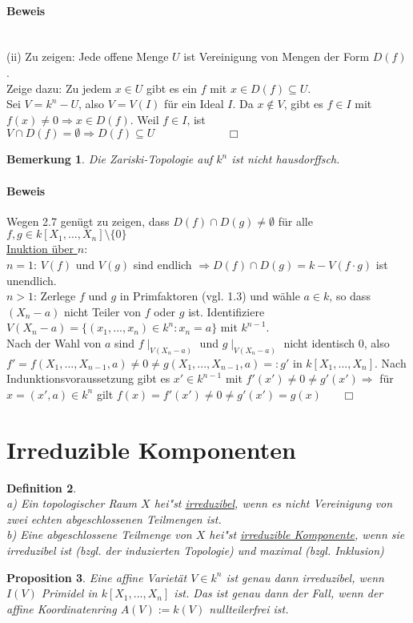 \documentclass[a4paper,12pt]{report}
\theoremstyle{break}
\newtheorem{Def}{Definition}[chapter]
\newtheorem{Bem}[Def]{Bemerkung}
\newtheorem{Prop}[Def]{Proposition}
\theoremstyle{nonumberbreak}
\theoremstyle{nonumberplain}
\begin{document}
\paragraph{Beweis}~\\
(ii) Zu zeigen: Jede offene Menge $U$ ist Vereinigung von Mengen der Form $D(f)$.\\
Zeige dazu: Zu jedem  $x\in U$ gibt es ein $f$ mit $x\in D(f)\subseteq U$.\\
Sei $V=k^n-U$, also $V=V(I)$ für ein Ideal $I$. Da $x\notin V$, gibt es $f\in I$
mit $f(x)\neq 0 \Rightarrow x\in D(f)$. Weil $f\in I$, ist $V\cap D(f) = \emptyset \Rightarrow D(f) \subseteq U~~~~~~~~~~~~~~~~~~~~~~~~~~~~~\Box$
\begin{Bem}
Die Zariski-Topologie auf $k^n$ ist nicht hausdorffsch.
\end{Bem}

\paragraph{Beweis} Wegen 2.7 genügt zu zeigen, dass $D(f)\cap D(g)\neq \emptyset$ für alle $f,g \in k[X_1,...,X_n]\setminus\{0\}$\\
\underline{Inuktion über $n$}:\\
\underline{$n=1$}: $V(f)$ und $V(g)$ sind endlich $\Rightarrow D(f)\cap D(g)=k-V(f\cdot g)$ ist unendlich.\\
\underline{$n>1$}:  Zerlege $f$ und $g$ in Primfaktoren (vgl. 1.3) und wähle $a\in k$, so dass $(X_n-a)$ nicht Teiler von $f$ oder $g$ ist. Identifiziere $V(X_n-a)= \{(x_1,...,x_n)\in k^n: x_n=a\}$ mit $k^{n-1}$.\\
Nach der Wahl von $a$ sind $f\mid_{V(X_n-a)}$ und $g\mid_{V(X_n-a)}$ nicht identisch $0$, also $f'=f(X_1,...,X_{n-1},a) \neq 0 \neq g(X_1,...,X_{n-1},a)=:g'$ in $k[X_1,...,X_n]$. Nach Indunktionsvoraussetzung gibt es $x'\in k^{n-1}$ mit $f'(x')\neq 0\neq g'(x')\Rightarrow$ für $x=(x',a)\in k^n$ gilt $f(x)=f'(x')\neq 0 \neq g'(x')=g(x)~~~~~~~~\Box$
\section{Irreduzible Komponenten}
\begin{Def}~\\
a) Ein topologischer Raum $X$ hei"st \underline{irreduzibel}, wenn es nicht Vereinigung von zwei echten abgeschlossenen Teilmengen ist.\\
b) Eine abgeschlossene Teilmenge von $X$ hei"st \underline{irreduzible Komponente}, wenn sie irreduzibel ist (bzgl. der induzierten Topologie) und maximal (bzgl. Inklusion)
\end{Def}
\begin{Prop}
Eine affine Varietät $V\in k^n$ ist genau dann irreduzibel, wenn $I(V)$ Primidel in $k[X_1,...,X_n]$ ist. Das ist genau dann der Fall, wenn der affine Koordinatenring $A(V):=k(V)$ nullteilerfrei ist.
\end{Prop}
\end{document}

